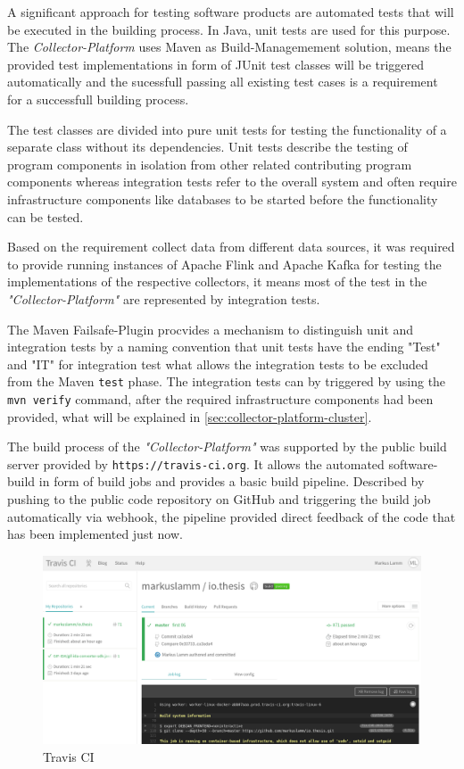 A significant approach for testing software products are automated tests that will be executed in the building process.
In Java, unit tests are used for this purpose. The \textit{Collector-Platform} uses Maven as Build-Managemement solution,
means the provided test implementations in form of JUnit test classes will be triggered automatically and the sucessfull passing
all existing test cases is a requirement for a successfull building process.

The test classes are divided into pure unit tests for testing the functionality of a separate class without its dependencies.
Unit tests describe the testing of program components in isolation from other related contributing program components whereas
integration tests refer to the overall system and often require infrastructure components like databases to be started before
the functionality can be tested.

Based on the requirement collect data from different data sources, it was required to provide running instances of Apache Flink and Apache Kafka
for testing the implementations of the respective collectors, it means most of the test in the \textit{"Collector-Platform"} are represented by
integration tests.

The Maven Failsafe-Plugin procvides a mechanism to distinguish unit and integration tests by a naming convention that unit tests
have the ending "Test" and "IT" for integration test what allows the integration tests to be excluded from the Maven \verb|test|
phase. The integration tests can by triggered by using the \verb|mvn verify| command, after the required infrastructure components
had been provided, what will be explained in \autoref{sec:collector-platform-cluster}.

The build process of the \textit{"Collector-Platform"} was supported by the public build server provided by \verb|https://travis-ci.org|.
It allows the automated software-build in form of build jobs and provides a basic build pipeline. Described by pushing to the public code
repository on GitHub and triggering the build job automatically via webhook, the pipeline provided direct feedback of the code that has been
implemented just now.
\begin{figure}[H]
	\centering
	\includegraphics[width=1.0\textwidth]{../images/07-travis.png}
	\caption{Travis CI}
	\label{fig:travis}
\end{figure}

